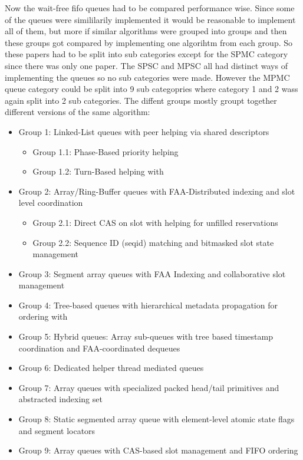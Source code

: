 Now the wait-free fifo queues had to be compared performance wise. Since some of the queues were simililarily implemented it would be reasonable to implement all of them, but more if similar algorithms were grouped into groups and then these groups got compared by implementing one algorihtm from each group. So these papers had to be split into sub categories except for the \ac{SPMC} category since there was only one paper. The \ac{SPSC} and \ac{MPSC} all had distinct ways of implementing the queues so no sub categories were made. However the \ac{MPMC} queue category could be split into 9 sub categopries where category 1 and 2 wass again split into 2 sub categories. The diffent groups mostly groupt together different versions of the same algorithm:
\begin{itemize}
   \item Group 1: Linked-List queues with peer helping via shared descriptors
   \begin{itemize}
      \item Group 1.1: Phase-Based priority helping \cite{Kogan2011WaitFreeQueues,kogan2012methodology}
      \item Group 1.2: Turn-Based helping with \cite{RamalheteQueue}
   \end{itemize}
   \item Group 2: Array/Ring-Buffer queues with FAA-Distributed indexing and slot level coordination
   \begin{itemize}
      \item Group 2.1: Direct CAS on slot with helping for unfilled reservations \cite{FastFetchAndAddWaitFreeQueue}
      \item Group 2.2: Sequence ID (seqid) matching and bitmasked slot state management \cite{FeldmanDechev2015WaitFreeRingBuffer,FeldmanDechevV2,FeldmanDechevV3}
   \end{itemize}
   \item Group 3: Segment array queues with FAA Indexing and collaborative slot management \cite{wCQWaitFreeQueue}
   \item Group 4: Tree-based queues with hierarchical metadata propagation for ordering with \cite{naderibeni2023waitfreequeuepolylogarithmicstep,Naderibeni2022WaitFree}
   \item Group 5: Hybrid queues: Array sub-queues with tree based timestamp coordination and FAA-coordinated dequeues \cite{johnen_et_al:LIPIcs.OPODIS.2022.4}
   \item Group 6: Dedicated helper thread mediated queues \cite{Verma2013Scalable}
   \item Group 7: Array queues with specialized packed head/tail primitives and abstracted indexing set \cite{KhanchandaniQueuePrimitives}
   \item Group 8: Static segmented array queue with element-level atomic state flags and segment locators \cite{StellwegQueue}
   \item Group 9: Array queues with CAS-based slot management and FIFO ordering \cite{Bedin2024WaitFreeBurden}
\end{itemize}